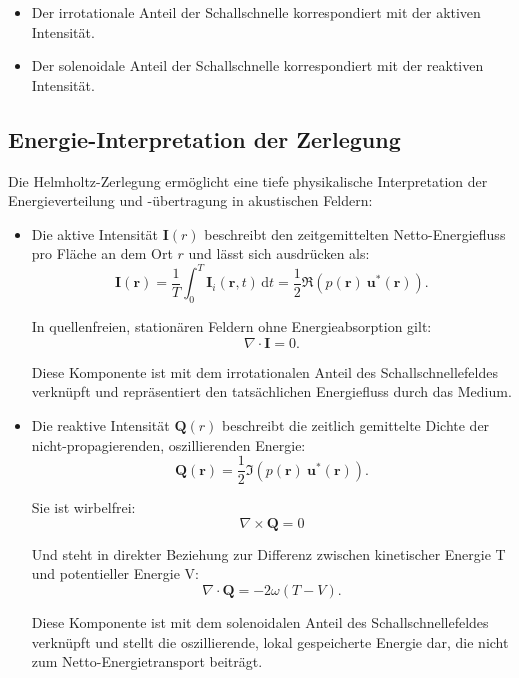 \begin{itemize}
\item Der irrotationale Anteil der Schallschnelle korrespondiert mit der aktiven Intensität.
\item Der solenoidale Anteil der Schallschnelle korrespondiert mit der reaktiven Intensität.
\end{itemize}

\subsection{Energie-Interpretation der Zerlegung}
 
Die Helmholtz-Zerlegung ermöglicht eine tiefe physikalische Interpretation der Energieverteilung und -übertragung in akustischen Feldern:
 
\begin{itemize}
\item Die aktive Intensität $\mathbf{I}(r)$ beschreibt den zeitgemittelten Netto-Energiefluss pro Fläche an dem Ort $r$ und lässt sich ausdrücken als:
\begin{equation}
\mathbf{I}(\mathbf{r}) = \frac{1}{T}\int_0^T \mathbf{I}_i(\mathbf{r},t)\,\mathrm{d}t = \frac{1}{2}\Re\left( p(\mathbf{r})~\mathbf{u}^*(\mathbf{r})\right).
\end{equation}
 
In quellenfreien, stationären Feldern ohne Energieabsorption gilt:
\begin{equation}
\nabla \cdot \mathbf{I} = 0.
\end{equation}
 
Diese Komponente ist mit dem irrotationalen Anteil des Schallschnellefeldes verknüpft und repräsentiert den tatsächlichen Energiefluss durch das Medium.
 
\item Die reaktive Intensität $\mathbf{Q}(r)$ beschreibt die zeitlich gemittelte Dichte der nicht-propagierenden, oszillierenden Energie:
\begin{equation}
\mathbf{Q}(\mathbf{r}) = \frac{1}{2}\Im\left(p(\mathbf{r})~\mathbf{u}^*(\mathbf{r})\right).
\end{equation}
 
Sie ist wirbelfrei:
\begin{equation}
\nabla \times \mathbf{Q} = 0
\end{equation}
 
Und steht in direkter Beziehung zur Differenz zwischen kinetischer Energie T und potentieller Energie V:
\begin{equation}
\nabla \cdot \mathbf{Q} = -2 \omega (T-V).
\end{equation}
 
Diese Komponente ist mit dem solenoidalen Anteil des Schallschnellefeldes verknüpft und stellt die oszillierende, lokal gespeicherte Energie dar, die nicht zum Netto-Energietransport beiträgt.
\end{itemize}
 
